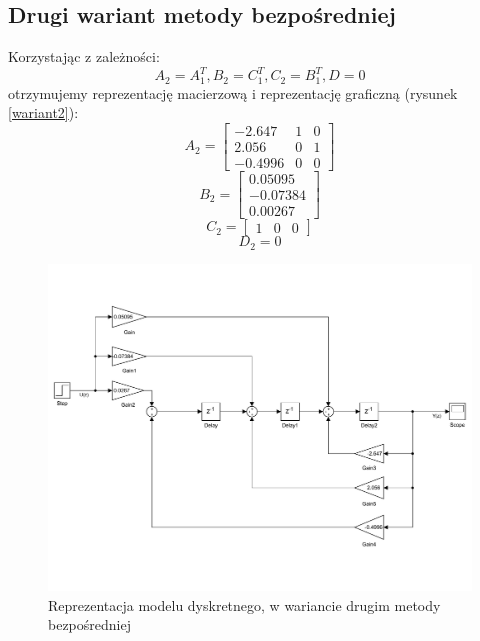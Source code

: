 \documentclass{article}
\begin{document}
\subsection{Drugi wariant metody bezpośredniej}
Korzystając z zależności:
\[A_2 = A_1^T, B_2 = C_1^T, C_2 = B_1^T, D = 0\]
otrzymujemy reprezentację macierzową i reprezentację graficzną (rysunek \ref{wariant2}):
\[A_2=\begin{bmatrix}
-2.647 & 1 & 0 \\ 2.056 & 0 & 1 \\ -0.4996 & 0 & 0
\end{bmatrix}\]
\[B_2=\begin{bmatrix}
0.05095 \\ -0.07384 \\ 0.00267
\end{bmatrix}\]
\[C_2=\begin{bmatrix}
1 & 0 & 0
\end{bmatrix}\]
\[D_2 = 0\]
\begin{figure}[h]
\centering
\includegraphics[width=0.8\linewidth]{zad2/wariant2}
\caption{Reprezentacja modelu dyskretnego, w wariancie drugim metody bezpośredniej}
\label{fig:wariant2}
\end{figure}
\end{document}
